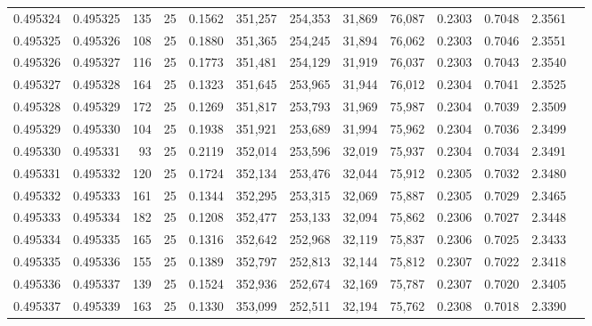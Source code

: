 \begin{tabular}{rrrrrrrrrrrrr}
0.495324 & 0.495325 &   135 &  25 &                                     0.1562 & 351,257 & 254,353 &  31,869 &  76,087 & 0.2303 & 0.7048 & 2.3561 \\
0.495325 & 0.495326 &   108 &  25 &                                     0.1880 & 351,365 & 254,245 &  31,894 &  76,062 & 0.2303 & 0.7046 & 2.3551 \\
0.495326 & 0.495327 &   116 &  25 &                                     0.1773 & 351,481 & 254,129 &  31,919 &  76,037 & 0.2303 & 0.7043 & 2.3540 \\
0.495327 & 0.495328 &   164 &  25 &                                     0.1323 & 351,645 & 253,965 &  31,944 &  76,012 & 0.2304 & 0.7041 & 2.3525 \\
0.495328 & 0.495329 &   172 &  25 &                                     0.1269 & 351,817 & 253,793 &  31,969 &  75,987 & 0.2304 & 0.7039 & 2.3509 \\
0.495329 & 0.495330 &   104 &  25 &                                     0.1938 & 351,921 & 253,689 &  31,994 &  75,962 & 0.2304 & 0.7036 & 2.3499 \\
0.495330 & 0.495331 &    93 &  25 &                                     0.2119 & 352,014 & 253,596 &  32,019 &  75,937 & 0.2304 & 0.7034 & 2.3491 \\
0.495331 & 0.495332 &   120 &  25 &                                     0.1724 & 352,134 & 253,476 &  32,044 &  75,912 & 0.2305 & 0.7032 & 2.3480 \\
0.495332 & 0.495333 &   161 &  25 &                                     0.1344 & 352,295 & 253,315 &  32,069 &  75,887 & 0.2305 & 0.7029 & 2.3465 \\
0.495333 & 0.495334 &   182 &  25 &                                     0.1208 & 352,477 & 253,133 &  32,094 &  75,862 & 0.2306 & 0.7027 & 2.3448 \\
0.495334 & 0.495335 &   165 &  25 &                                     0.1316 & 352,642 & 252,968 &  32,119 &  75,837 & 0.2306 & 0.7025 & 2.3433 \\
0.495335 & 0.495336 &   155 &  25 &                                     0.1389 & 352,797 & 252,813 &  32,144 &  75,812 & 0.2307 & 0.7022 & 2.3418 \\
0.495336 & 0.495337 &   139 &  25 &                                     0.1524 & 352,936 & 252,674 &  32,169 &  75,787 & 0.2307 & 0.7020 & 2.3405 \\
0.495337 & 0.495339 &   163 &  25 &                                     0.1330 & 353,099 & 252,511 &  32,194 &  75,762 & 0.2308 & 0.7018 & 2.3390 \\

\end{tabular}
